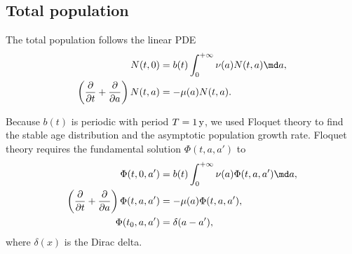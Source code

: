 \documentclass{jpmarticle}
\begin{document}
\subsection{Total population}

The total population follows the linear PDE
\begin{equation}
  \begin{split}
    N(t, 0)
    &= b(t) \int_0^{+\infty} \nu(a) N(t, a) \md a,
    \\
    \left(\frac{\partial}{\partial t}
      + \frac{\partial}{\partial a}\right)
    N(t, a)
    &= - \mu(a) N(t, a).
  \end{split}
\end{equation}

Because $b(t)$ is periodic with period $T = \unit[1]{y}$, we used
Floquet theory \autocite{parker_1992} to find the stable age
distribution and the asymptotic population growth rate. Floquet theory
requires the fundamental solution $\Phi(t, a, a')$ to
\begin{equation}
  \begin{split}
    \Phi(t, 0, a')
    &= b(t) \int_0^{+\infty} \nu(a) \Phi(t, a, a') \md a,
    \\
    \left(\frac{\partial}{\partial t}
      + \frac{\partial}{\partial a}\right)
    \Phi(t, a, a')
    &= - \mu(a) \Phi(t, a, a'),
    \\
    \Phi(t_0, a, a')
    &= \delta(a - a'),
  \end{split}
\end{equation}
where $\delta(x)$ is the Dirac delta.
\end{document}

